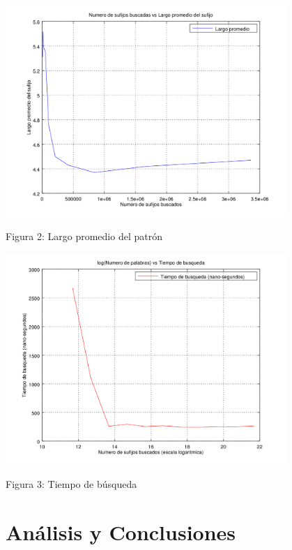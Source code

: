 \documentclass[letterpaper,10pt]{article}
\begin{document}
	\begin{center}
		\includegraphics[width=0.8\textwidth]{fig2.png}

		Figura 2: Largo promedio del patrón
	\end{center}

	\begin{center}
		\includegraphics[width=0.8\textwidth]{fig3.png}

		Figura 3: Tiempo de búsqueda
	\end{center}

	\newpage

	\section{Análisis y Conclusiones}
\end{document}
